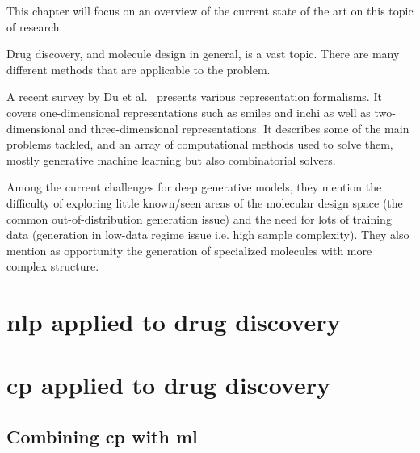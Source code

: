 \documentclass[../Document.tex]{subfiles}
\begin{document}
\label{chap:lit-review}

This chapter will focus on an overview of the current state of the art on this topic of research.

Drug discovery, and molecule design in general, is a vast topic.
There are many different methods that are applicable to the problem.

A recent survey by Du et al.~\cite{du2022molgensurvey} presents various representation formalisms. It covers one-dimensional representations such as \acrshort{smiles} and \acrshort{inchi} as well as two-dimensional and three-dimensional representations.
It describes some of the main problems tackled, and an array of computational methods used to solve them, mostly generative machine learning but also combinatorial solvers.


Among the current challenges for deep generative models, they mention the difficulty of exploring little known/seen areas of the molecular design space (the common out-of-distribution generation issue) and the need for lots of training data (generation in low-data regime issue i.e. high sample complexity).
They also mention as opportunity the generation of specialized molecules with more complex structure.

\section{\acrshort{nlp} applied to drug discovery}
\label{sec:lit-review/nlp}



\section{\acrshort{cp} applied to drug discovery}
\label{sec:lit-review/cp}



\subsection{Combining \acrshort{cp} with \acrshort{ml}}
\label{sec:lit-review/gpt+cp}
\end{document}
